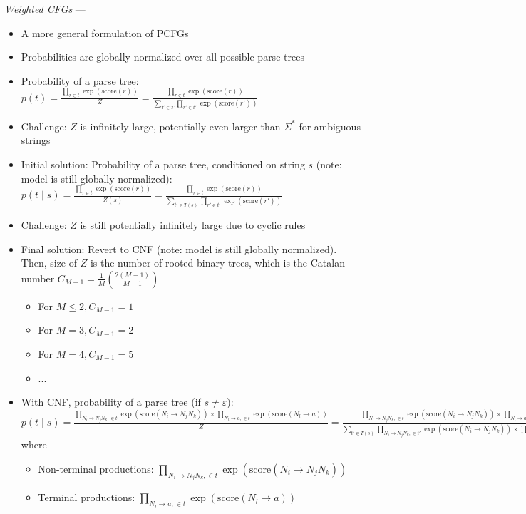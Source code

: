 \emph{Weighted CFGs} ---
\begin{itemize}
    \item A more general formulation of PCFGs
    \item Probabilities are globally normalized over all possible parse trees
    \item Probability of a parse tree:
    $
    p(t) = \frac{\prod_{r \in t} \exp(\textrm{score}(r))}{Z} = \frac{\prod_{r \in t} \exp(\textrm{score}(r))}{\sum_{t' \in T} \prod_{r' \in t'} \exp(\textrm{score}(r'))}
    $
    \item Challenge: $Z$ is infinitely large, potentially even larger than $\Sigma^*$ for ambiguous strings
    \item Initial solution: Probability of a parse tree, conditioned on string $s$ (note: model is still globally normalized):
    $
    p(t \mid s) = \frac{\prod_{r \in t} \exp(\textrm{score}(r))}{Z(s)} = \frac{\prod_{r \in t} \exp(\textrm{score}(r))}{\sum_{t' \in T(s)} \prod_{r' \in t'} \exp(\textrm{score}(r'))}
    $
    \item Challenge: $Z$ is still potentially infinitely large due to cyclic rules
    \item Final solution: Revert to CNF (note: model is still globally normalized). Then, size of $Z$ is the number of rooted binary trees, which is the Catalan number $C_{M-1} = \frac{1}{M} \binom{2(M-1)}{M-1}$
    \begin{itemize}
        \item For $M\leq2, C_{M-1} = 1$
        \item For $M=3, C_{M-1} = 2$
        \item For $M=4, C_{M-1} = 5$
        \item $...$
    \end{itemize}
    \item With CNF, probability of a parse tree (if $s \neq \varepsilon$):
    $p(t \mid s) = \frac{\prod_{N_i \to N_j N_k, \in t} \exp(\textrm{score}(N_i \to N_j N_k)) \times \prod_{N_l \to a, \in t} \exp(\textrm{score}(N_l \to a))}{Z} = \frac{\prod_{N_i \to N_j N_k, \in t} \exp(\textrm{score}(N_i \to N_j N_k)) \times \prod_{N_l \to a, \in t} \exp(\textrm{score}(N_l \to a))}{\sum_{t' \in T(s)} \prod_{N_i \to N_j N_k, \in t'} \exp(\textrm{score}(N_i \to N_j N_k)) \times \prod_{N_l \to a, \in t'} \exp(\textrm{score}(N_l \to a))} $ where
    \begin{itemize}
        \item Non-terminal productions: $\prod_{N_i \to N_j N_k, \in t} \exp(\textrm{score}(N_i \to N_j N_k))$
        \item Terminal productions: $\prod_{N_l \to a, \in t} \exp(\textrm{score}(N_l \to a))$
    \end{itemize}
\end{itemize}

